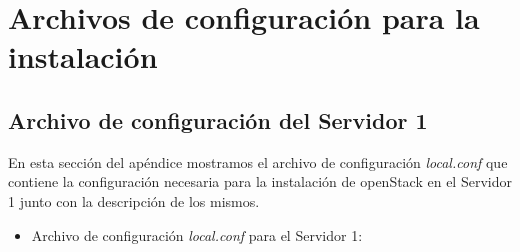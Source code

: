 \chapter{Archivos de configuración para la instalación} \label{chap:manualdeinstalacion}

\section{Archivo de configuración del Servidor 1}\label{sec:ConfServer1}
En esta sección del apéndice mostramos el archivo de configuración \textit{local.conf} que contiene la configuración necesaria para la instalación de openStack en el Servidor 1 junto con la descripción de los mismos.

\begin{itemize}
\item Archivo de configuración \textit{local.conf} para el Servidor 1:
\end{itemize}

